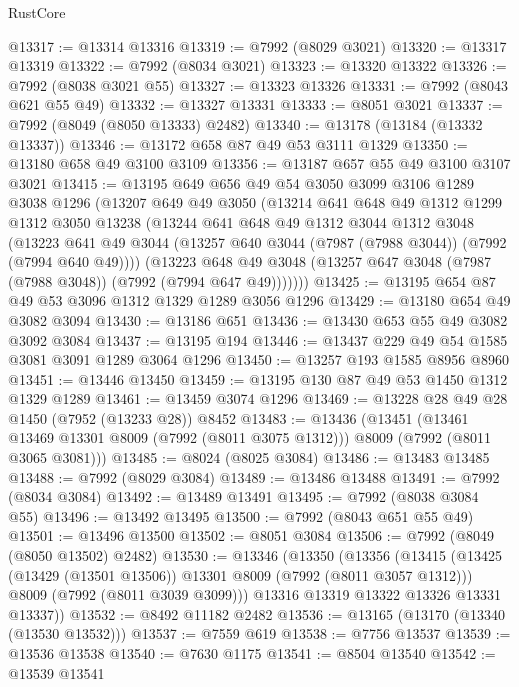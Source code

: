 \begin{lexlean}{RustCore}
\begin{coremodule}
@13317 := @13314 @13316
@13319 := @7992 (@8029 @3021)
@13320 := @13317 @13319
@13322 := @7992 (@8034 @3021)
@13323 := @13320 @13322
@13326 := @7992 (@8038 @3021 @55)
@13327 := @13323 @13326
@13331 := @7992 (@8043 @621 @55 @49)
@13332 := @13327 @13331
@13333 := @8051 @3021
@13337 := @7992 (@8049 (@8050 @13333) @2482)
@13340 := @13178 (@13184 (@13332 @13337))
@13346 := @13172 @658 @87 @49 @53 @3111 @1329
@13350 := @13180 @658 @49 @3100 @3109
@13356 := @13187 @657 @55 @49 @3100 @3107 @3021
@13415 := @13195
    @649
    @656
    @49
    @54
    @3050
    @3099
    @3106
    @1289
    @3038
    @1296
    (@13207
      @649
      @49
      @3050
      (@13214
        @641
        @648
        @49
        @1312
        @1299
        @1312
        @3050
        @13238
        (@13244
          @641
          @648
          @49
          @1312
          @3044
          @1312
          @3048
          (@13223 @641 @49 @3044 (@13257 @640 @3044 (@7987 (@7988 @3044)) (@7992 (@7994 @640 @49))))
          (@13223
            @648
            @49
            @3048
            (@13257 @647 @3048 (@7987 (@7988 @3048)) (@7992 (@7994 @647 @49)))))))
@13425 := @13195 @654 @87 @49 @53 @3096 @1312 @1329 @1289 @3056 @1296
@13429 := @13180 @654 @49 @3082 @3094
@13430 := @13186 @651
@13436 := @13430 @653 @55 @49 @3082 @3092 @3084
@13437 := @13195 @194
@13446 := @13437 @229 @49 @54 @1585 @3081 @3091 @1289 @3064 @1296
@13450 := @13257 @193 @1585 @8956 @8960
@13451 := @13446 @13450
@13459 := @13195 @130 @87 @49 @53 @1450 @1312 @1329 @1289
@13461 := @13459 @3074 @1296
@13469 := @13228 @28 @49 @28 @1450 (@7952 (@13233 @28)) @8452
@13483 := @13436
    (@13451
      (@13461 @13469 @13301 @8009 (@7992 (@8011 @3075 @1312)))
      @8009
      (@7992 (@8011 @3065 @3081)))
@13485 := @8024 (@8025 @3084)
@13486 := @13483 @13485
@13488 := @7992 (@8029 @3084)
@13489 := @13486 @13488
@13491 := @7992 (@8034 @3084)
@13492 := @13489 @13491
@13495 := @7992 (@8038 @3084 @55)
@13496 := @13492 @13495
@13500 := @7992 (@8043 @651 @55 @49)
@13501 := @13496 @13500
@13502 := @8051 @3084
@13506 := @7992 (@8049 (@8050 @13502) @2482)
@13530 := @13346
    (@13350
      (@13356
        (@13415
          (@13425 (@13429 (@13501 @13506)) @13301 @8009 (@7992 (@8011 @3057 @1312)))
          @8009
          (@7992 (@8011 @3039 @3099)))
        @13316
        @13319
        @13322
        @13326
        @13331
        @13337))
@13532 := @8492 @11182 @2482
@13536 := @13165 (@13170 (@13340 (@13530 @13532)))
@13537 := @7559 @619
@13538 := @7756 @13537
@13539 := @13536 @13538
@13540 := @7630 @1175
@13541 := @8504 @13540
@13542 := @13539 @13541

\end{coremodule}
\end{lexlean}

